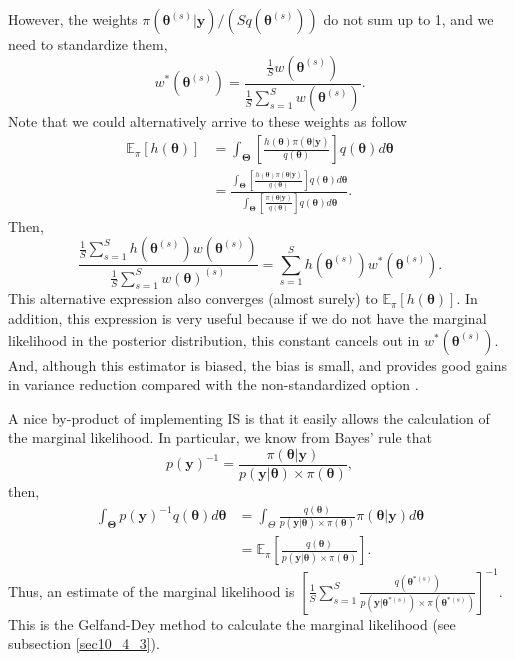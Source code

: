 However, the weights $\pi(\bm{\theta}^{(s)}|\bm{y})/(Sq(\bm{\theta}^{(s)}))$ do not sum up to 1, and we need to standardize them, 
$$w^*(\bm{\theta}^{(s)})=\frac{\frac{1}{S} w(\bm{\theta}^{(s)})}{\frac{1}{S}\sum_{s=1}^Sw(\bm{\theta}^{(s)})}.$$
Note that we could alternatively arrive to these weights as follow 
\begin{align*}\label{eq5_4}
	\mathbb{E}_{\pi}[h(\bm{\theta})]&=\int_{\bm{\Theta}} \left[\frac{h(\bm{\theta}) \pi(\bm{\theta}|\bm{y})}{q(\bm{\theta})}\right]q(\bm{\theta})d\bm{\theta}\\
	&=\frac{\int_{\bm{\Theta}}\left[\frac{h(\bm{\theta}) \pi(\bm{\theta}|\bm{y})}{q(\bm{\theta})}\right] q(\bm{\theta})d\bm{\theta}}{\int_{\bm{\Theta}}\left[\frac{ \pi(\bm{\theta}|\bm{y})}{q(\bm{\theta})}\right] q(\bm{\theta})d\bm{\theta}}.
\end{align*}
Then, $$\frac{\frac{1}{S}\sum_{s=1}^Sh(\bm{\theta}^{(s)})w(\bm{\theta}^{(s)})}{\frac{1}{S}\sum_{s=1}^Sw(\bm{\theta})^{(s)}}= \sum_{s=1}^S h(\bm{\theta}^{(s)})w^*(\bm{\theta}^{(s)}).$$ This alternative expression also converges (almost surely) to $\mathbb{E}_{\pi}[h(\bm{\theta})]$.  In addition, this expression is very useful because if we do not have the marginal likelihood in the posterior distribution, this constant cancels out in $w^*(\bm{\theta}^{(s)})$. And, although this estimator is biased, the bias is small, and provides good gains in variance reduction compared with the non-standardized option \cite[Chap.~3]{robert2011monte}.

A nice by-product of implementing IS is that it easily allows the calculation of the marginal likelihood. In particular, we know from Bayes' rule that
$$p(\bm{y})^{-1}=\frac{\pi(\bm{\theta}|\bm{y})}{p(\bm{y}|\bm{\theta})\times \pi(\bm{\theta})},$$
then, 
\begin{align*}
	\int_{\bm{\Theta}}p(\bm{y})^{-1}q(\bm{\theta})d\bm{\theta}&=\int_{{\Theta}}\frac{q(\bm{\theta})}{p(\bm{y}|\bm{\theta})\times \pi(\bm{\theta})}\pi(\bm{\theta}|\bm{y})d\bm{\theta}\\
	&=\mathbb{E}_{\pi}\left[\frac{q(\bm{\theta})}{p(\bm{y}|\bm{\theta})\times \pi(\bm{\theta})}\right].
\end{align*}
Thus, an estimate of the marginal likelihood is $\left[\frac{1}{S}\sum_{s=1}^S\frac{q(\bm{\theta}^{*(s)})}{p(\bm{y}|\bm{\theta}^{*(s)})\times\pi(\bm{\theta}^{*(s)})}\right]^{-1}$. This is the Gelfand-Dey method to calculate the marginal likelihood \cite{gelfand1994bayesian} (see subsection \ref{sec10_4_3}).\\

